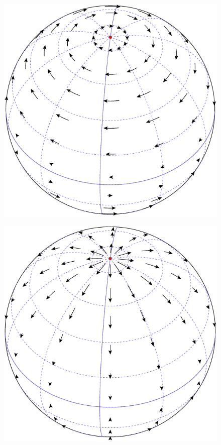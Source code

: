 \begin{figure}
\begin{minipage}[b]{.5\linewidth}
\centering
\includegraphics[scale=0.7]{images/Xlm1m0.pdf}
\label{fig:basis_xlmzlm_a}
\end{minipage}%
\begin{minipage}[b]{.5\linewidth}
\centering
\includegraphics[scale=0.7]{images/Zlm1m0.pdf}
\label{fig:basis_xlmzlm_b}
\end{minipage}


\end{figure}
